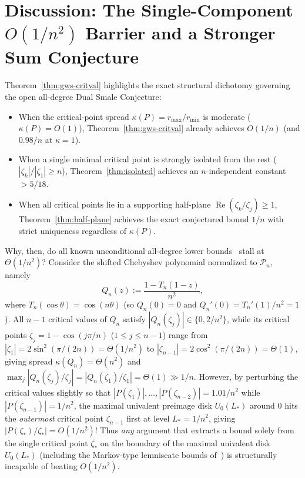 \documentclass[11pt,a4paper]{article}
\theoremstyle{definition}
\theoremstyle{remark}
\DeclareMathOperator{\RePart}{Re}
\begin{document}
\section{Discussion: The Single-Component $O(1/n^2)$ Barrier and a Stronger Sum Conjecture}

Theorem~\ref{thm:gws-critval} highlights the exact structural dichotomy governing the open all-degree Dual Smale Conjecture:
\begin{itemize}
\item When the critical-point spread $\kappa(P) = r_{\max}/r_{\min}$ is moderate ($\kappa(P) = O(1)$), Theorem~\ref{thm:gws-critval} already achieves $O(1/n)$ (and $0.98/n$ at $\kappa = 1$).
\item When a single minimal critical point is strongly isolated from the rest ($|\zeta_k|/|\zeta_1| \ge n$), Theorem~\ref{thm:isolated} achieves an $n$-independent constant $> 5/18$.
\item When all critical points lie in a supporting half-plane $\RePart(\zeta_k/\zeta_j) \ge 1$, Theorem~\ref{thm:half-plane} achieves the exact conjectured bound $1/n$ with strict uniqueness regardless of $\kappa(P)$.
\end{itemize}

Why, then, do all known unconditional all-degree lower bounds~\cite{Dubinin2019,JatarNg2026} stall at $\Theta(1/n^2)$?
Consider the shifted Chebyshev polynomial normalized to $\mathcal{P}_n$, namely
\[
Q_n(z) := \frac{1 - T_n(1 - z)}{n^2},
\]
where $T_n(\cos\theta) = \cos(n\theta)$ (so $Q_n(0) = 0$ and $Q_n'(0) = T_n'(1)/n^2 = 1$). All $n - 1$ critical values of $Q_n$ satisfy $|Q_n(\zeta_j)| \in \{0, 2/n^2\}$, while its critical points $\zeta_j = 1 - \cos(j\pi/n)$ ($1 \le j \le n - 1$) range from $|\zeta_1| = 2\sin^2(\pi/(2n)) = \Theta(1/n^2)$ to $|\zeta_{n-1}| = 2\cos^2(\pi/(2n)) = \Theta(1)$, giving spread $\kappa(Q_n) = \Theta(n^2)$ and $\max_j |Q_n(\zeta_j)/\zeta_j| = |Q_n(\zeta_1)/\zeta_1| = \Theta(1) \gg 1/n$.
However, by perturbing the critical values slightly so that $|P(\zeta_1)|, \dots, |P(\zeta_{n-2})| = 1.01/n^2$ while $|P(\zeta_{n-1})| = 1/n^2$, the maximal univalent preimage disk $U_0(L_*)$ around $0$ hits the \emph{outermost} critical point $\zeta_{n-1}$ first at level $L_* = 1/n^2$, giving $|P(\zeta_*)/\zeta_*| = O(1/n^2)$!
Thus \emph{any} argument that extracts a bound solely from the single critical point $\zeta_*$ on the boundary of the maximal univalent disk $U_0(L_*)$ (including the Markov-type lemniscate bounds of~\cite{Dubinin2019,JatarNg2026}) is structurally incapable of beating $O(1/n^2)$.
\end{document}
